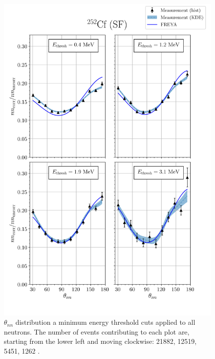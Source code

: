 \begin{figure}
\centering
    \includegraphics[width = \textwidth]{Content/Results/FinalCf252Resultw_freya0KDE.png}
    \caption{
    $\theta_{nn}$ distribution a minimum energy threshold cuts applied to all neutrons.
    The number of events contributing to each plot are, starting from the lower left and moving clockwise: 21882, 12519, 5451, 1262 .}
    \label{fig:Cf(0)}
\end{figure}
